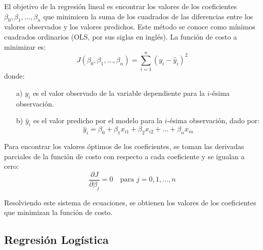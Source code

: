 \documentclass[a4paper]{report} %
\begin{document}
El objetivo de la regresión lineal es encontrar los valores de los coeficientes $\beta_0, \beta_1, \ldots, \beta_n$ que minimicen la suma de los cuadrados de las diferencias entre los valores observados y los valores predichos. Este método se conoce como mínimos cuadrados ordinarios (OLS, por sus siglas en inglés). La función de costo a minimizar es:
\begin{equation}
J\left(\beta_0, \beta_1, \ldots, \beta_n\right) = \sum_{i=1}^{n}\left(y_i - \hat{y}_i\right)^2
\end{equation}
donde:
\begin{itemize}
    \item[a) ] $y_i$ es el valor observado de la variable dependiente para la $i$-ésima observación.
    \item[b) ] $\hat{y}_i$ es el valor predicho por el modelo para la $i$-ésima observación, dado por:
    \begin{equation}
    \hat{y}_i = \beta_0 + \beta_1 x_{i1} + \beta_2 x_{i2} + \ldots + \beta_n x_{in}
    \end{equation}
\end{itemize}

Para encontrar los valores óptimos de los coeficientes, se toman las derivadas parciales de la función de costo con respecto a cada coeficiente y se igualan a cero:
\begin{equation}
\frac{\partial J}{\partial \beta_j} = 0 \quad \text{para } j = 0, 1, \ldots, n
\end{equation}

Resolviendo este sistema de ecuaciones, se obtienen los valores de los coeficientes que minimizan la función de costo.
\subsection{Regresión Logística}
\end{document}
